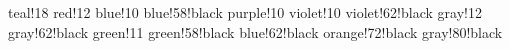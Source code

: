 %
%

   {teal!18}
   {red!12}
     {blue!10}
  {blue!58!black}
   {purple!10}
     {violet!10}
  {violet!62!black}
    {gray!12}
 {gray!62!black}
    {green!11}
 {green!58!black}
 {blue!62!black}
 {orange!72!black}
 {gray!80!black}

